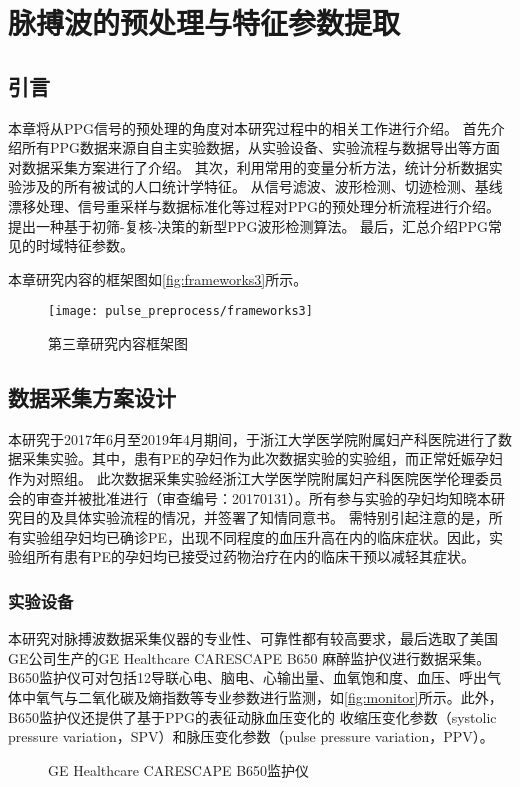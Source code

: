 \chapter{脉搏波的预处理与特征参数提取}
\section{引言}
本章将从PPG信号的预处理的角度对本研究过程中的相关工作进行介绍。
首先介绍所有PPG数据来源自自主实验数据，从实验设备、实验流程与数据导出等方面对数据采集方案进行了介绍。
其次，利用常用的变量分析方法，统计分析数据实验涉及的所有被试的人口统计学特征。
从信号滤波、波形检测、切迹检测、基线漂移处理、信号重采样与数据标准化等过程对PPG的预处理分析流程进行介绍。提出一种基于初筛-复核-决策的新型PPG波形检测算法。
最后，汇总介绍PPG常见的时域特征参数。

本章研究内容的框架图如\autoref{fig:frameworks3}所示。

\begin{figure}[htbp]
    \centering
    \texttt{[image: pulse\_preprocess/frameworks3]}
    \caption{\label{fig:frameworks3}第三章研究内容框架图}
\end{figure}
\section{数据采集方案设计}
本研究于2017年6月至2019年4月期间，于浙江大学医学院附属妇产科医院进行了数据采集实验。其中，患有PE的孕妇作为此次数据实验的实验组，而正常妊娠孕妇作为对照组。
此次数据采集实验经浙江大学医学院附属妇产科医院医学伦理委员会的审查并被批准进行（审查编号：20170131）。所有参与实验的孕妇均知晓本研究目的及具体实验流程的情况，并签署了知情同意书。
需特别引起注意的是，所有实验组孕妇均已确诊PE，出现不同程度的血压升高在内的临床症状。因此，实验组所有患有PE的孕妇均已接受过药物治疗在内的临床干预以减轻其症状。
\subsection{实验设备}
本研究对脉搏波数据采集仪器的专业性、可靠性都有较高要求，最后选取了美国GE公司生产的GE Healthcare CARESCAPE B650 麻醉监护仪进行数据采集。
B650监护仪可对包括12导联心电、脑电、心输出量、血氧饱和度、血压、呼出气体中氧气与二氧化碳及熵指数等专业参数进行监测，如\autoref{fig:monitor}所示。此外，B650监护仪还提供了基于PPG的表征动脉血压变化的
收缩压变化参数（systolic pressure variation，SPV）和脉压变化参数（pulse pressure variation，PPV）\cite{GE2021,Michard1999}。
\begin{figure}[htbp]
    \centering
    \quad
    \caption{\label{fig:monitor}GE Healthcare CARESCAPE B650监护仪}
\end{figure}

